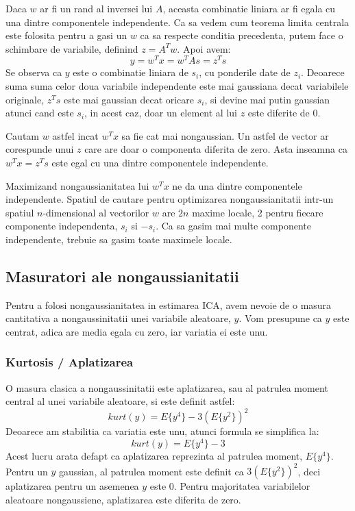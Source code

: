 \documentclass[12pt]{article}
\begin{document}
 Daca $w$ ar fi un rand al inversei lui $A$, aceasta combinatie liniara ar fi egala cu una dintre componentele independente. Ca sa vedem cum teorema limita centrala este folosita pentru a gasi un $w$ ca sa respecte conditia precedenta, putem face o schimbare de variabile, definind $z=A^Tw$. Apoi avem:
 \begin{equation}
	 y=w^Tx=w^TAs=z^Ts
 \end{equation}
 Se observa ca $y$ este o combinatie liniara de $s_i$, cu ponderile date de $z_i$. Deoarece suma suma celor doua variabile independente este mai gaussiana decat variabilele originale, $z^Ts$ este mai gaussian decat oricare $s_i$, si devine mai putin gaussian atunci cand este $s_i$, in acest caz, doar un element al lui $z$ este diferite de 0. 
 
 Cautam $w$ astfel incat $w^Tx$ sa fie cat mai nongaussian. Un astfel de vector ar corespunde unui $z$ care are doar o componenta diferita de zero. Asta inseamna ca $w^Tx=z^Ts$ este egal cu una dintre componentele independente.

 Maximizand nongaussianitatea lui $w^Tx$ ne da una dintre componentele independente. Spatiul de cautare pentru optimizarea nongaussianitatii intr-un spatiul $n$-dimensional al vectorilor $w$ are $2n$ maxime locale, 2 pentru fiecare componente independenta, $s_i$ si $-s_i$. Ca sa gasim mai multe componente independente, trebuie sa gasim toate maximele locale.  
\newpage
\subsection{Masuratori ale nongaussianitatii}
Pentru a folosi nongaussianitatea in estimarea ICA, avem nevoie de o masura cantitativa a nongaussinitatii unei variabile aleatoare, $y$. Vom presupune ca $y$ este centrat, adica are media egala cu zero, iar variatia ei este unu. 
\subsubsection{Kurtosis / Aplatizarea}
O masura clasica a nongaussinitatii este aplatizarea, sau al patrulea moment central al unei variabile aleatoare, si este definit astfel:
\begin{equation}
kurt(y)=E\{y^4\}-3(E\{y^2\})^2
\end{equation}
Deoarece am stabilitia ca variatia este unu, atunci formula se simplifica la:
\begin{equation}
kurt(y)=E\{y^4\}-3
\end{equation}
Acest lucru arata defapt ca aplatizarea reprezinta al patrulea moment, $E\{y^4\}$. Pentru un $y$ gaussian, al patrulea moment este definit ca $3(E\{y^2\})^2$, deci aplatizarea pentru un asemenea $y$ este 0. Pentru majoritatea variabilelor aleatoare nongaussiene, aplatizarea este diferita de zero.
\end{document}
